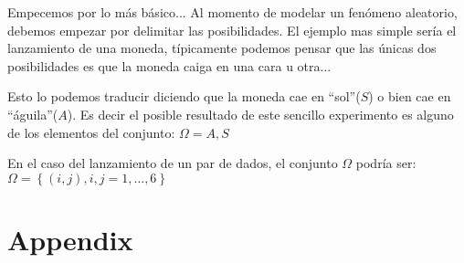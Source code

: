 \documentclass[a4paper,12pt,twoside]{book}
\begin{document}
Empecemos por lo más básico... Al momento de modelar un fenómeno aleatorio, debemos empezar por delimitar las posibilidades. El ejemplo mas simple sería el lanzamiento de una moneda, típicamente podemos pensar que las únicas dos posibilidades es que la moneda caiga en una cara u otra...

Esto lo podemos traducir diciendo que la moneda cae en ``sol''($S$) o bien cae en ``águila''($A$). Es decir el posible resultado de este sencillo experimento es alguno de los elementos del conjunto: $\Omega = {A, S}$

En el caso del lanzamiento de un par de dados, el conjunto $\Omega$ podría ser: $\Omega = \left\{(i , j), i , j = 1,\ldots , 6\right\}$


\appendix
\chapter{Appendix}

%
%
\end{document}
